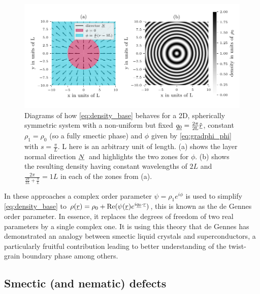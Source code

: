 \documentclass[12pt]{article}
\newcommand{\suf}[2]{\stackunder[0.5pt]{\stackunder[1pt]{\ensuremath{#1}}{\rule{\widthof{\ensuremath{#2}}*\real{0.9}}{.1ex}}}{}}
\newcommand{\su}[1]{\suf{#1}{#1}}
\newcommand{\ssu}[1]{\scriptsize\su{#1}\normalsize}
\newcommand{\NN}{\ensuremath{\su{N}}}
\begin{document}
        \begin{figure}[t]
            \begin{center}
                \includegraphics{figures/misc/wave_phi_example.pdf}
            \end{center}
            \caption{
                Diagrams of how \cref{eq:density_base} behaves for a 2D, spherically symmetric system with a non-uniform but fixed $\su{q_0} = \frac{2\pi}{2\si{L}}\hat{\su{r}}$, constant $\rho_1 = \rho_0$ (so a fully smectic phase) and $\phi$ given by \cref{eq:gradphi_phi} with $s=\frac{\pi}{\si{L}}$.
                \si{L} here is an arbitrary unit of length.
                (a) shows the layer normal direction \NN\ and highlights the two zones for $\phi$.
                (b) shows the resulting density having constant wavelengths of $2\si{L}$ and $\frac{2\pi}{\frac{2\pi}{2\si{L}}+\frac{\pi}{\si{L}}} = 1\si{L}$ in each of the zones from (a).
            }\label{fig:gradphi}
        \end{figure}

        In these approaches a complex order parameter $\psi=\rho_1e^{i\phi}$ is used to simplify \cref{eq:density_base} to $\rho(\su{r}) = \rho_0 + \Re(\psi(\su{r}) e^{i\ssu{q_0}\cdot\ssu{r}})$, this is known as the de Gennes order parameter.
        In essence, it replaces the degrees of freedom of two real parameters by a single complex one.
        It is using this theory that de Gennes has demonstrated an analogy between smectic liquid crystals and superconductors\cite{degennesAnalogySuperconductorsSmectics1972}, a particularly fruitful contribution leading to better understanding of the twist-grain boundary phase\cite{lubenskyTwistgrainboundaryPhasesNematic1990} among others.

    \subsection{Smectic (and nematic) defects}
\end{document}

